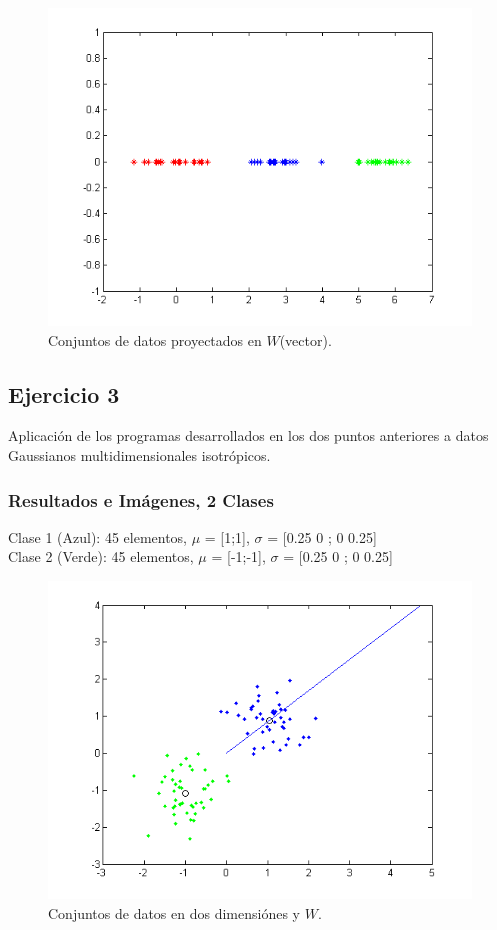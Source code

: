 \begin{figure}[ht!]
\centering
\includegraphics[width=120mm]{img/tp4/ej2-3.png}
\caption{Conjuntos de datos proyectados en $W$(vector).}
\end{figure}

\subsection{Ejercicio 3}

Aplicación de los programas desarrollados en los dos puntos anteriores a datos Gaussianos multidimensionales
isotrópicos.

\subsubsection{Resultados e Imágenes, 2 Clases}

Clase 1 (Azul): 45 elementos, $\mu$ = [1;1], $\sigma$ = [0.25 0 ; 0 0.25]\\
Clase 2 (Verde): 45 elementos, $\mu$ = [-1;-1], $\sigma$ = [0.25 0 ; 0 0.25]\\

\begin{figure}[ht!]
\centering
\includegraphics[width=120mm]{img/tp4/ej3-1.png}
\caption{Conjuntos de datos en dos dimensiónes y $W$.}
\end{figure}

